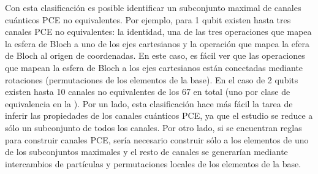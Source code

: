 Con esta clasificación es posible identificar un subconjunto maximal 
de canales cuánticos PCE no equivalentes.
Por ejemplo, para 1 qubit existen hasta tres canales PCE no equivalentes:
la identidad, una de las tres operaciones que mapea la esfera de Bloch a uno 
de los ejes cartesianos y la operación que mapea la efera de Bloch al 
origen de coordenadas. 
En este caso, es fácil ver que las operaciones que mapean 
la esfera de Bloch a los ejes cartesianos están conectadas mediante 
rotaciones (permutaciones de los elementos de la base). En el caso de 2 qubits 
existen hasta 10 canales no equivalentes de los 67 en total (uno por clase de equivalencia
en la ). 
Por un lado, esta clasificación hace más fácil la tarea de inferir las propiedades 
de los canales cuánticos PCE, ya que el estudio se reduce a sólo un subconjunto
de todos los canales. 
Por otro lado, si se encuentran 
reglas para construir canales PCE, sería necesario construir sólo a los elementos
de uno de los subconjuntos maximales y el resto de canales se
generarían mediante intercambios de partículas y permutaciones locales 
de los elementos de la base. 



%
%
%

